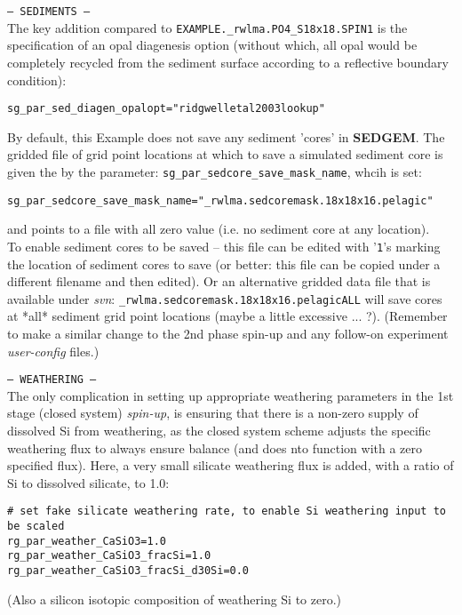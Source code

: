 \documentclass[10pt,twoside]{article}
\begin{document}
\begin{compactitem}
\item \texttt{--- SEDIMENTS ---}
\\The key addition compared to \texttt{EXAMPLE.\_rwlma.PO4\_S18x18.SPIN1} is the specification of an opal diagenesis option (without which, all opal would be completely recycled from the sediment surface according to a reflective boundary condition):
\vspace{-5pt}\begin{verbatim}
sg_par_sed_diagen_opalopt="ridgwelletal2003lookup"
\end{verbatim}\vspace{-5pt}
By default, this Example does not save any sediment 'cores' in \textbf{SEDGEM}. The gridded file of grid point locations at which to save a simulated sediment core is given the by the parameter: \texttt{sg\_par\_sedcore\_save\_mask\_name}, whcih is set:
\vspace{-5pt}\begin{verbatim}
sg_par_sedcore_save_mask_name="_rwlma.sedcoremask.18x18x16.pelagic"
\end{verbatim}\vspace{-5pt}
and points to a file with all zero value (i.e. no sediment core at any location).
\\To enable sediment cores to be saved -- this file can be edited with '\texttt{1}'s marking the location of sediment cores to save (or better: this file can be copied under a different filename and then edited). Or an alternative gridded data file that is available under \textit{svn}: \texttt{\_rwlma.sedcoremask.18x18x16.pelagicALL} will save cores at *all* sediment grid point locations (maybe a little excessive ... ?). (Remember to make a similar change to the 2nd phase spin-up and any follow-on experiment \textit{user-config} files.) 

\item \texttt{--- WEATHERING ---}
\\The only complication in setting up appropriate weathering parameters in the 1st stage (closed system) \textit{spin-up}, is ensuring that there is a non-zero supply of dissolved Si from weathering, as the closed system scheme adjusts the specific weathering flux to always ensure balance (and does nto function with a zero specified flux). Here, a very small silicate weathering flux is added, with a ratio of Si to dissolved silicate, to 1.0:        
\vspace{-5pt}\begin{verbatim}
# set fake silicate weathering rate, to enable Si weathering input to be scaled
rg_par_weather_CaSiO3=1.0
rg_par_weather_CaSiO3_fracSi=1.0
rg_par_weather_CaSiO3_fracSi_d30Si=0.0
\end{verbatim}\vspace{-5pt}
(Also a silicon isotopic composition of weathering Si to zero.)
 
\end{compactitem}
\end{document}
